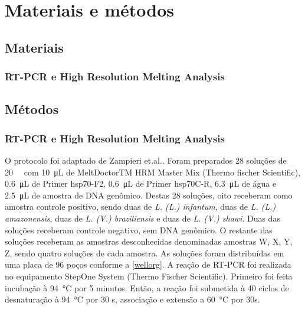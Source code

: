\section{Materiais e métodos}
\subsection{Materiais}
\subsubsection{RT-PCR e High Resolution Melting Analysis}
     
\subsection{Métodos}
\subsubsection{RT-PCR e High Resolution Melting Analysis}
O protocolo foi adaptado de Zampieri et.al.\cite{HRMzampi2016}.
Foram preparados 28 soluções de \qty{20}{\micro\literL} com
\qty{10}{\micro\liter} de
MeltDoctorTM HRM Master Mix (Thermo fischer Scientific), \qty{0,6}{\micro\liter} de
Primer hsp70-F2, \qty{0,6}{\micro\liter} de Primer hsp70C-R,
\qty{6,3}{\micro\liter} de
água e \qty{2,5}{\micro\liter} de amostra de DNA genômico. Destas 28 soluções,
oito receberam como amostra controle positivo, sendo duas de \textit{L. (L.)
infantum}, duas de \textit{L. (L.) amazonensis}, duas de \textit{L. (V.)
braziliensis} e duas de \textit{L. (V.) shawi}. Duas das soluções receberam
controle negativo, sem DNA genômico. O restante das soluções receberam as
amostras desconhecidas denominadas amostras W, X, Y, Z, sendo quatro soluções de
cada amostra. As soluções foram distribuídas em uma placa de 96 poços conforme a
\cref{wellorg}. A reação de RT-PCR foi realizada no equipamento StepOne System
(Thermo Fischer Scientific). Primeiro foi feita incubação à \qty{94}{\celsius}
por 5 minutos.  Então, a reação foi submetida à 40 ciclos de desnaturação à
\qty{94}{\celsius} por 30 s, associação e extensão a \qty{60}{\celsius} por 30s. 

